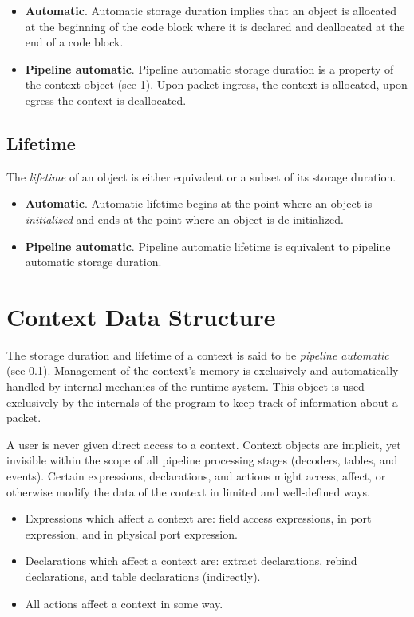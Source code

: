 \begin{itemize}
\item \textbf{Automatic}. Automatic storage duration implies that an object is allocated at the beginning of the code block where it is declared and deallocated at the end of a code block.
\item \textbf{Pipeline automatic}. Pipeline automatic storage duration is a property of the context object (see \ref{context_guide}). Upon packet ingress, the context is allocated, upon egress the context is deallocated.
\end{itemize}

\subsection{Lifetime} \label{lifetime_guide}

The \textit{lifetime} of an object is either equivalent or a subset of its storage duration.

\begin{itemize}
\item \textbf{Automatic}. Automatic lifetime begins at the point where an object is \textit{initialized} and ends at the point where an object is de-initialized.
\item \textbf{Pipeline automatic}. Pipeline automatic lifetime is equivalent to pipeline automatic storage duration.
\end{itemize}

\section{Context Data Structure} \label{context_guide}

The storage duration and lifetime of a context is said to be \textit{pipeline automatic} (see \ref{lifetime_guide}). Management of the context's memory is exclusively and automatically handled by internal mechanics of the runtime system. This object is used exclusively by the internals of the program to keep track of information about a packet.

A user is never given direct access to a context. Context objects are implicit, yet invisible within the scope of all pipeline processing stages (decoders, tables, and events). Certain expressions, declarations, and actions might access, affect, or otherwise modify the data of the context in limited and well-defined ways.
\begin{itemize}
\item Expressions which affect a context are: field access expressions, in port expression, and in physical port expression.

\item Declarations which affect a context are: extract declarations, rebind declarations, and table declarations (indirectly).

\item All actions affect a context in some way.
\end{itemize}

